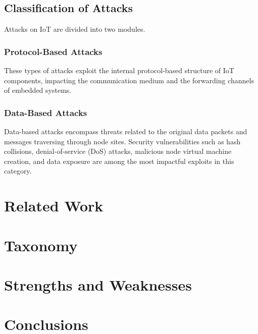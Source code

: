 \documentclass[conference,compsoc]{IEEEtran}
\begin{document}
\subsection{Classification of Attacks}
Attacks on IoT are divided into two modules.
\subsubsection{Protocol-Based Attacks} 
These types of attacks exploit the internal protocol-based structure of IoT components, impacting the communication medium and the forwarding channels of embedded systems.
\subsubsection{Data-Based Attacks} 
Data-based attacks encompass threats related to the original data packets and messages traversing through node sites. Security vulnerabilities such as hash collisions, denial-of-service (DoS) attacks, malicious node virtual machine creation, and data exposure are among the most impactful exploits in this category.

\section{Related Work}

\section{Taxonomy}

\section{Strengths and Weaknesses}

\section{Conclusions}



\end{document}
